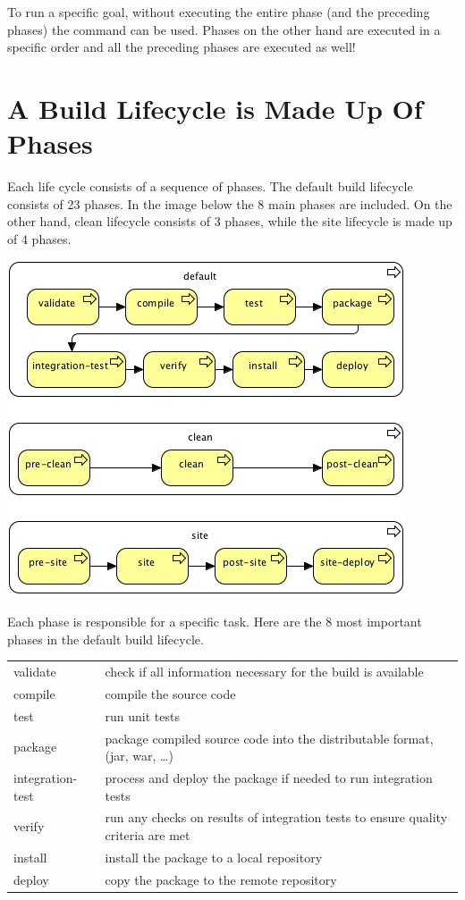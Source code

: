 To run a specific goal, without executing the entire phase (and the preceding phases) the command  can be used.  Phases on the other hand are executed in a specific order and all the preceding phases are executed as well!

\section{A Build Lifecycle is Made Up Of Phases}

Each life cycle consists of a sequence of phases. The default build lifecycle consists of 23 phases. In the image below the 8 main phases are included. On the other hand, clean lifecycle consists of 3 phases, while the site lifecycle is made up of 4 phases.

\includegraphics[width=\textwidth]{./images/chapter3/maven-lifecycles} 

Each phase is responsible for a specific task. Here are the 8 most important phases in the default build lifecycle.

\begin{tabularx}{\textwidth}{ |l|X| } 
 \hline
validate & check if all information necessary for the build is available \\
compile & compile the source code \\
test & run unit tests \\
package & package compiled source code into the distributable format, (jar, war, …)\\
integration-test & process and deploy the package if needed to run integration tests \\
verify & run any checks on results of integration tests to ensure quality criteria are met\\
install & install the package to a local repository\\
deploy & copy the package to the remote repository\\
 \hline
\end{tabularx}

